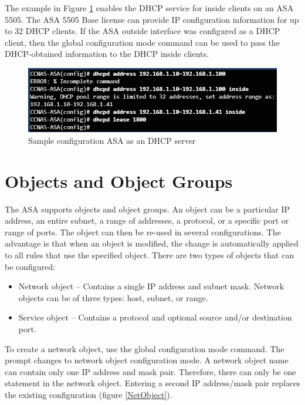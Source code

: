 The example in Figure \ref{DHCPcommand} enables the DHCP service for inside clients on an ASA 5505. The ASA 5505 Base license can provide IP configuration information for up to 32 DHCP clients. If the ASA outside interface was configured as a DHCP client, then the  global configuration mode command can be used to pass the DHCP-obtained information to the DHCP inside clients.

\begin{figure}[hbtp]
\caption{Sample configuration ASA as an DHCP server}\label{DHCPcommand}
\centering
\includegraphics[scale=0.5]{pictures/DHCPcommand.PNG}
\end{figure}

\section{Objects and Object Groups}

The ASA supports objects and object groups. An object can be a particular IP address, an entire subnet, a range of addresses, a protocol, or a specific port or range of ports. The object can then be re-used in several configurations. The advantage is that when an object is modified, the change is automatically applied to all rules that use the specified object. There are two types of objects that can be configured:

\begin{itemize}
\item Network object -- Contains a single IP address and subnet mask. Network objects can be of three types: host, subnet, or range. 
\item Service object -- Contains a protocol and optional source and/or destination port.
\end{itemize}

To create a network object, use the  global configuration mode command. The prompt changes to network object configuration mode. A network object name can contain only one IP address and mask pair. Therefore, there can only be one statement in the network object. Entering a second IP address/mask pair replaces the existing configuration (figure \ref{NetObject}).

